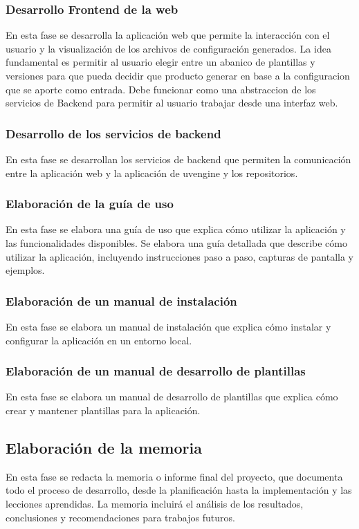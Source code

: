 \documentclass[12pt, a4paper, twoside]{article}
\begin{document}
\subsubsection{Desarrollo Frontend de la web}
En esta fase se desarrolla la aplicación web que permite la interacción con el usuario y la visualización de los archivos de configuración generados.
La idea fundamental es permitir al usuario elegir entre un abanico de plantillas y versiones para que pueda decidir que producto generar en base a la configuracion que se aporte como entrada.
Debe funcionar como una abstraccion de los servicios de Backend para permitir al usuario trabajar desde una interfaz web.
\subsubsection{Desarrollo de los servicios de backend}
En esta fase se desarrollan los servicios de backend que permiten la comunicación entre la aplicación web y la aplicación de uvengine y los repositorios.
\subsubsection{Elaboración de la guía de uso}
En esta fase se elabora una guía de uso que explica cómo utilizar la aplicación y las funcionalidades disponibles.
Se elabora una guía detallada que describe cómo utilizar la aplicación, incluyendo instrucciones paso a paso, capturas 
de pantalla y ejemplos. 
\subsubsection{Elaboración de un manual de instalación}
En esta fase se elabora un manual de instalación que explica cómo instalar y configurar la aplicación en un entorno local.
\subsubsection{Elaboración de un manual de desarrollo de plantillas}
En esta fase se elabora un manual de desarrollo de plantillas que explica cómo crear y mantener plantillas para la aplicación.
\subsection{Elaboración de la memoria}
En esta fase se redacta la memoria o informe final del proyecto, que documenta todo el proceso de desarrollo, desde la 
planificación hasta la implementación y las lecciones aprendidas. La memoria incluirá el análisis de los resultados, 
conclusiones y recomendaciones para trabajos futuros. 
\end{document}
